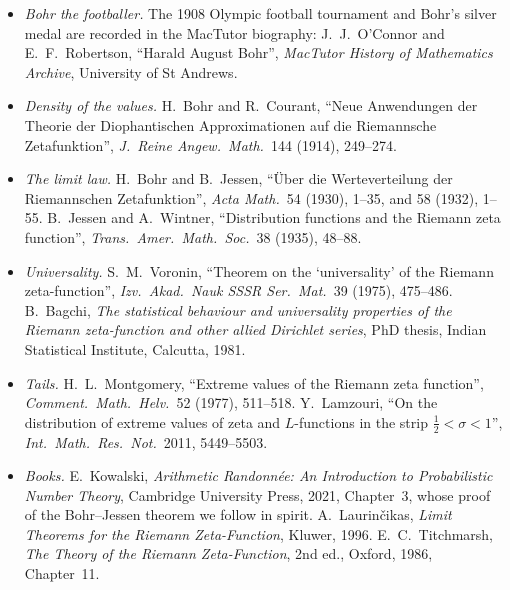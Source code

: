 \begin{itemize}
\item \emph{Bohr the footballer.} The 1908 Olympic football tournament and Bohr's silver medal are recorded in the MacTutor biography: J.~J.~O'Connor and E.~F.~Robertson, ``Harald August Bohr'', \emph{MacTutor History of Mathematics Archive}, University of St Andrews.
\item \emph{Density of the values.} H.~Bohr and R.~Courant, ``Neue Anwendungen der Theorie der Diophantischen Approximationen auf die Riemannsche Zetafunktion'', \emph{J.\ Reine Angew.\ Math.}\ 144 (1914), 249--274.
\item \emph{The limit law.} H.~Bohr and B.~Jessen, ``Über die Werteverteilung der Riemannschen Zetafunktion'', \emph{Acta Math.}\ 54 (1930), 1--35, and 58 (1932), 1--55. B.~Jessen and A.~Wintner, ``Distribution functions and the Riemann zeta function'', \emph{Trans.\ Amer.\ Math.\ Soc.}\ 38 (1935), 48--88.
\item \emph{Universality.} S.~M.~Voronin, ``Theorem on the `universality' of the Riemann zeta-function'', \emph{Izv.\ Akad.\ Nauk SSSR Ser.\ Mat.}\ 39 (1975), 475--486. B.~Bagchi, \emph{The statistical behaviour and universality properties of the Riemann zeta-function and other allied Dirichlet series}, PhD thesis, Indian Statistical Institute, Calcutta, 1981.
\item \emph{Tails.} H.~L.~Montgomery, ``Extreme values of the Riemann zeta function'', \emph{Comment.\ Math.\ Helv.}\ 52 (1977), 511--518. Y.~Lamzouri, ``On the distribution of extreme values of zeta and $L$-functions in the strip $\frac12<\sigma<1$'', \emph{Int.\ Math.\ Res.\ Not.}\ 2011, 5449--5503.
\item \emph{Books.} E.~Kowalski, \emph{Arithmetic Randonnée: An Introduction to Probabilistic Number Theory}, Cambridge University Press, 2021, Chapter~3, whose proof of the Bohr--Jessen theorem we follow in spirit. A.~Laurinčikas, \emph{Limit Theorems for the Riemann Zeta-Function}, Kluwer, 1996. E.~C.~Titchmarsh, \emph{The Theory of the Riemann Zeta-Function}, 2nd ed., Oxford, 1986, Chapter~11.
\end{itemize}
